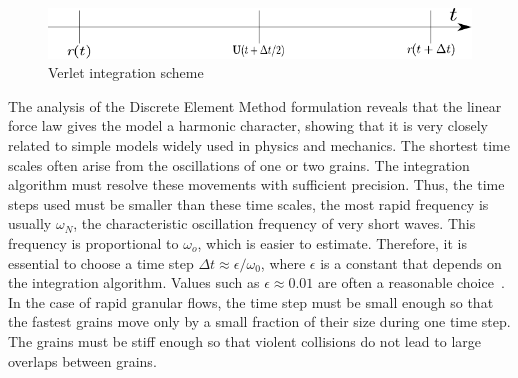 \begin{figure}[htbp]
\centering
\includegraphics{Leap}
\caption{Verlet integration scheme}
\label{fig:verlet}
\end{figure}
The analysis of the Discrete Element Method formulation reveals that the linear 
force law gives 
the 
model a harmonic character, showing that it is very closely related to simple 
models widely used 
in 
physics and mechanics. The shortest time scales often arise from the 
oscillations of one or two 
grains. The integration algorithm must resolve these movements with sufficient 
precision. Thus, 
the 
time steps used must be smaller than these time scales, the most rapid 
frequency is usually 
${\omega}_{\mathit{N}}$, the characteristic oscillation frequency of very short 
waves. This 
frequency is proportional to $\omega _{o}$, which is easier to estimate. 
Therefore, it is 
essential 
to choose a time step $\Delta t \approx \epsilon / \omega_{0}$, where 
$\epsilon$ is a constant 
that 
depends on the integration algorithm. Values such as $\epsilon \approx 0.01$ 
are often a 
reasonable 
choice~\citep{Sean2011}. In the case of rapid granular flows, the time step 
must be small enough 
so 
that the fastest grains move only by a small fraction of their size during one 
time step. The 
grains must be stiff enough so that violent collisions do not lead to large 
overlaps between 
grains. 
